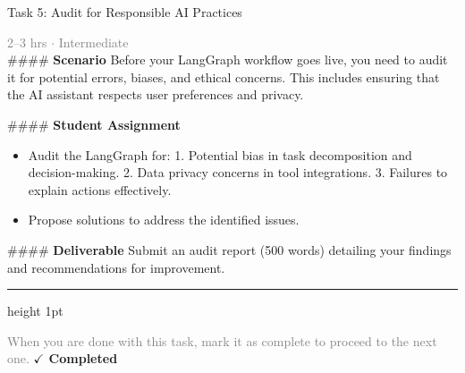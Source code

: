 \documentclass[10pt,a4paper]{article}
\begin{document}
\begin{taskbox}{Task 5: Audit for Responsible AI Practices}

    {\small \textcolor{gray}{2--3 hrs $\cdot$ Intermediate}}\\[12pt]

    \#\#\#\# \textbf{Scenario}
Before your LangGraph workflow goes live, you need to audit it for potential errors, biases, and ethical concerns. This includes ensuring that the AI assistant respects user preferences and privacy.

\#\#\#\# \textbf{Student Assignment}
\begin{itemize}
    \item Audit the LangGraph for:
  1. Potential bias in task decomposition and decision-making.
  2. Data privacy concerns in tool integrations.
  3. Failures to explain actions effectively.
    \item Propose solutions to address the identified issues.
\end{itemize}

\#\#\#\# \textbf{Deliverable}
Submit an audit report (500 words) detailing your findings and recommendations for improvement.\par

    \vspace{16pt}

    \textcolor{cardBorder}{\hrule height 1pt}\vspace{8pt}

    \small \textcolor{gray}{When you are done with this task, mark it as complete to proceed to the next one.} \hfill \textbf{\textcolor{brandDark}{$\checkmark$ Completed}}

\end{taskbox}
\end{document}

